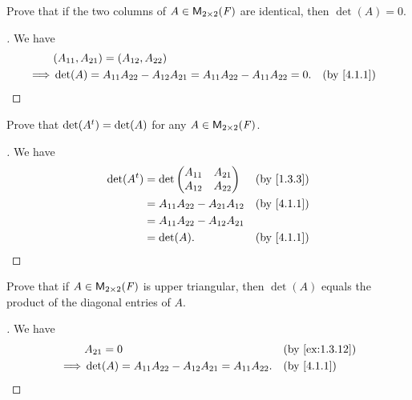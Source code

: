 \begin{ex}\label{ex:4.1.6}
	Prove that if the two columns of \(A \in \ms[2][2][\F]\) are identical, then \(\det(A) = 0\).
\end{ex}

\begin{proof}[]
	We have
	\begin{align*}
		         & (A_{1 1}, A_{2 1}) = (A_{1 2}, A_{2 2})                                                              \\
		\implies & \det(A) = A_{1 1} A_{2 2} - A_{1 2} A_{2 1} = A_{1 1} A_{2 2} - A_{1 1} A_{2 2} = 0. &  & \by{4.1.1}
	\end{align*}
\end{proof}

\begin{ex}\label{ex:4.1.7}
	Prove that \(\det({A}^{t}) = \det(A)\) for any \(A \in \ms[2][2][\F]\).
\end{ex}

\begin{proof}[]
	We have
	\begin{align*}
		\det(\tp{A}) & = \det\begin{pmatrix}
			                     A_{1 1} & A_{2 1} \\
			                     A_{1 2} & A_{2 2}
		                     \end{pmatrix}               &  & \by{1.3.3}   \\
		             & = A_{1 1} A_{2 2} - A_{2 1} A_{1 2} &  & \by{4.1.1} \\
		             & = A_{1 1} A_{2 2} - A_{1 2} A_{2 1}                 \\
		             & = \det(A).                          &  & \by{4.1.1}
	\end{align*}
\end{proof}

\begin{ex}\label{ex:4.1.8}
	Prove that if \(A \in \ms[2][2][\F]\) is upper triangular, then \(\det(A)\) equals the product of the diagonal entries of \(A\).
\end{ex}

\begin{proof}[]
	We have
	\begin{align*}
		         & A_{2 1} = 0                                                    &  & \by{ex:1.3.12} \\
		\implies & \det(A) = A_{1 1} A_{2 2} - A_{1 2} A_{2 1} = A_{1 1} A_{2 2}. &  & \by{4.1.1}
	\end{align*}
\end{proof}


